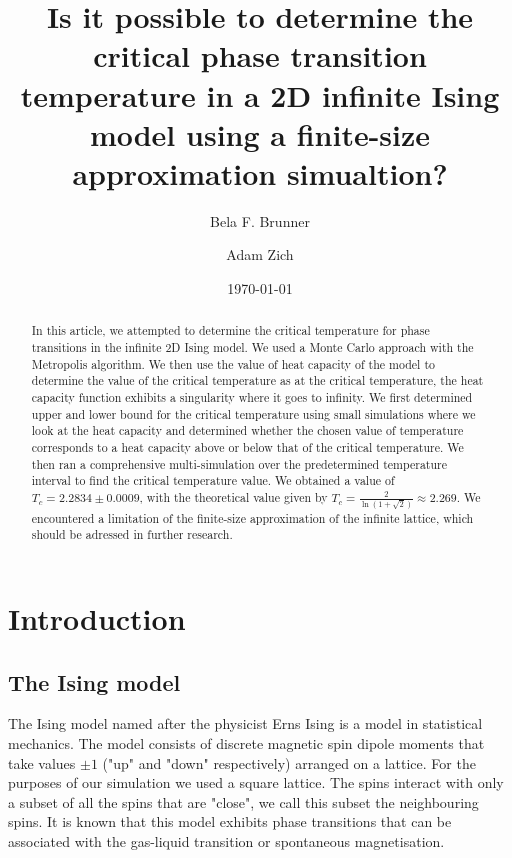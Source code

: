 \documentclass[twocolumn,a4paper,aps,amsmath,amssymb,floatfix,superscriptaddress]{revtex4-2}
\begin{document}
\title{Is it possible to determine the critical phase transition temperature in a 2D infinite Ising model using a finite-size approximation simualtion?}
        
\author{Bela F. Brunner}

\author{Adam Zich}

\date{\today}

\begin{abstract}
    In this article, we attempted to determine the critical temperature for phase transitions in the infinite 2D Ising model. We used a Monte Carlo approach with the Metropolis algorithm. We then use the value of heat capacity of the model to determine the value of the critical temperature as at the critical temperature, the heat capacity function exhibits a singularity where it goes to infinity\cite{Onsager1944}. We first determined upper and lower bound for the critical temperature using small simulations where we look at the heat capacity and determined whether the chosen value of temperature corresponds to a heat capacity above or below that of the critical temperature. We then ran a comprehensive multi-simulation over the predetermined temperature interval to find the critical temperature value. We obtained a value of $T_c = 2.2834 \pm 0.0009$, with the theoretical value given by $T_c = \frac{2}{\ln(1 + \sqrt{2})} \approx 2.269$. We encountered a limitation of the finite-size approximation of the infinite lattice, which should be adressed in further research.
\end{abstract}

\maketitle

\section{Introduction}\label{intro}
    \subsection{The Ising model}
        The Ising model named after the physicist Erns Ising is a model in statistical mechanics. The model consists of discrete magnetic spin dipole moments that take values $\pm 1$ ("up" and "down" respectively) arranged on a lattice. For the purposes of our simulation we used a square lattice. The spins interact with only a subset of all the spins that are "close", we call this subset the neighbouring spins. It is known that this model exhibits phase transitions that can be associated with the gas-liquid transition or spontaneous magnetisation. \cite{Blundell2010}
\end{document}
